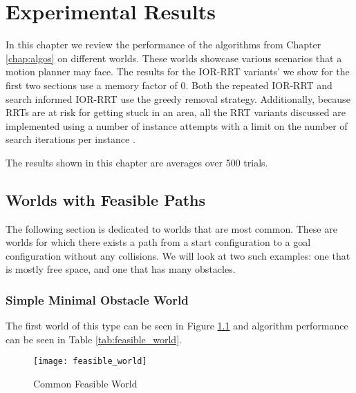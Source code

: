 \chapter{Experimental Results}
In this chapter we review the performance of the algorithms from Chapter \ref{chap:algos} on different worlds. These worlds showcase various scenarios that a motion planner may face. The results for the IOR-RRT variants' we show for the first two sections use a memory factor of 0. Both the repeated IOR-RRT and search informed IOR-RRT use the greedy removal strategy. Additionally, because RRTs are at risk for getting stuck in an area, all the RRT variants discussed are implemented using a number of instance attempts with a limit on the number of search iterations per instance \cite{wedge:heavytail}.

The results shown in this chapter are averages over 500 trials.

\section{Worlds with Feasible Paths}\label{results:feasible}
The following section is dedicated to worlds that are most common. These are worlds for which there exists a path from a start configuration to a goal configuration without any collisions. We will look at two such examples: one that is mostly free space, and one that has many obstacles.

\subsection{Simple Minimal Obstacle World}
The first world of this type can be seen in Figure \ref{fig:feasible_world} and algorithm performance can be seen in Table \ref{tab:feasible_world}. 

\begin{figure}[h!]
    \centering
    \texttt{[image: feasible\_world]}
    \caption{Common Feasible World}
    \label{fig:feasible_world}
\end{figure}

